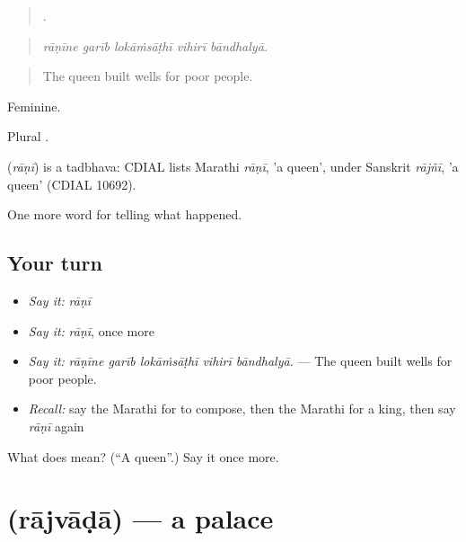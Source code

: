 \begin{quote}
    .
\end{quote}

\begin{quote}
\emph{rāṇīne garīb lokāṁsāṭhī vihirī bāndhalyā.}
\end{quote}

\begin{quote}
The queen built wells for poor people.
\end{quote}

Feminine.

Plural .

\begin{cousinweb}
\textbf{} (\emph{rāṇī}) is a tadbhava: CDIAL lists Marathi \emph{rāṇī}, 'a queen', under Sanskrit \emph{rājñī}, 'a queen' (CDIAL 10692).
\end{cousinweb}

\begin{grammarlens}[title={What you've built}]
One more word for telling what happened.
\end{grammarlens}

\subsection*{Your turn}
\begin{itemize}
\raggedright
  \item \emph{Say it:} \emph{rāṇī}
  \item \emph{Say it:} \emph{rāṇī}, once more
  \item \emph{Say it:} \emph{rāṇīne garīb lokāṁsāṭhī vihirī bāndhalyā.} — The queen built wells for poor people.
  \item \emph{Recall:} say the Marathi for to compose, then the Marathi for a king, then say \emph{rāṇī} again
\end{itemize}

\begin{tcolorbox}[breakable,colback=teal!4,colframe=teal!35!black,title={Before you move on}]
What does  mean? (\textquotedblleft{}A queen\textquotedblright{}.) Say it once more.
\end{tcolorbox}
\section[\texorpdfstring{\mr{राजवाडा} (rājvāḍā)}{राजवाडा (rājvāḍā)}]{ (rājvāḍā) — a palace}

